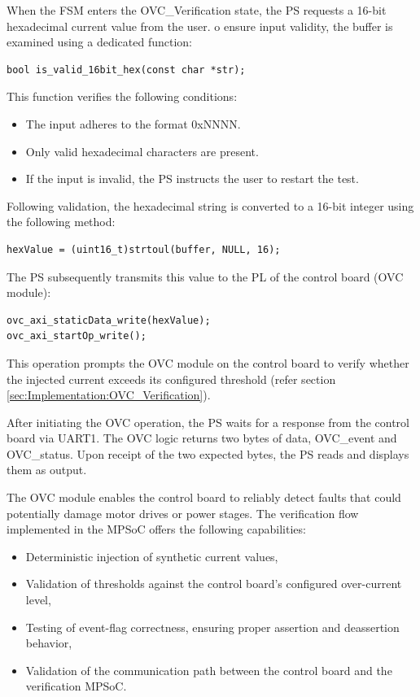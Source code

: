 When the \acs{FSM} enters the \acs{OVC}\_Verification state, the \acs{PS} requests a 16-bit hexadecimal current value from the user. o ensure input validity, the buffer is examined using a dedicated function:

\begin{lstlisting}
bool is_valid_16bit_hex(const char *str);
\end{lstlisting}

This function verifies the following conditions:
\begin{itemize}
	\item The input adheres to the format 0xNNNN.
	\item Only valid hexadecimal characters are present.
	\item If the input is invalid, the \acs{PS} instructs the user to restart the test.
\end{itemize}

Following validation, the hexadecimal string is converted to a 16-bit integer using the following method:

\begin{lstlisting}
hexValue = (uint16_t)strtoul(buffer, NULL, 16);
\end{lstlisting}

The \acs{PS} subsequently transmits this value to the \acs{PL} of the control board (\acs{OVC} module):

\begin{lstlisting}
ovc_axi_staticData_write(hexValue);
ovc_axi_startOp_write();
\end{lstlisting}

This operation prompts the \acs{OVC} module on the control board to verify whether the injected current exceeds its configured threshold (refer section \ref{sec:Implementation:OVC_Verification}). 

After initiating the \acs{OVC} operation, the \acs{PS} waits for a response from the control board via UART1. The \acs{OVC} logic returns two bytes of data, \acs{OVC}\_event and \acs{OVC}\_status. Upon receipt of the two expected bytes, the \acs{PS} reads and displays them as output.

The \acs{OVC} module enables the control board to reliably detect faults that could potentially damage motor drives or power stages. The verification flow implemented in the \acs{MPSoC} offers the following capabilities:

\begin{itemize}
	\item Deterministic injection of synthetic current values,
	\item Validation of thresholds against the control board’s configured over-current level,
	\item Testing of event-flag correctness, ensuring proper assertion and deassertion behavior,
	\item Validation of the communication path between the control board and the verification \acs{MPSoC}.
\end{itemize}

